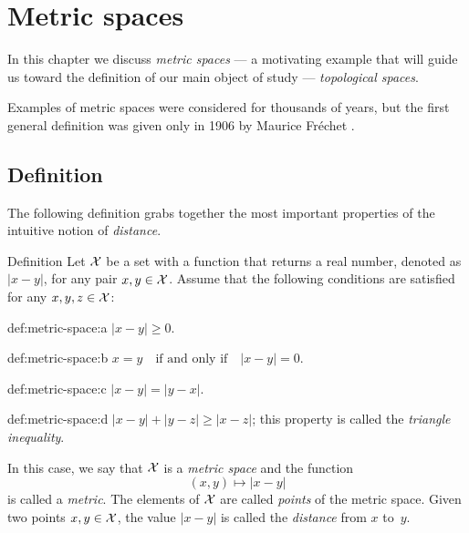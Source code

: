 \chapter{Metric spaces}

In this chapter we discuss \textit{metric spaces} --- 
a motivating example that will guide us toward the definition of our main object of study ---
\textit{topological spaces}.

Examples of metric spaces were considered for thousands of years,
but the first general definition was given only in 1906 by Maurice Fr\'echet \cite{frechet}.

\section{Definition}

The following definition grabs together the most important properties of the intuitive notion of \textit{distance}.

\begin{thm}{Definition}\label{def:metric-space}
Let $\mathcal{X}$ be a set
with a function 
that returns a real number, denoted as $|x-y|$,
for any pair $x,y\in\mathcal{X}$.
Assume that the following conditions are satisfied for any
$x,y,z\in \mathcal{X}$:

\begin{subthm}{def:metric-space:a}
$|x-y|\ge 0.$
\end{subthm}

\begin{subthm}{def:metric-space:b}
$x=y\quad\text{if and only if}\quad |x-y|=0.$
\end{subthm}

\begin{subthm}{def:metric-space:c}
$|x-y| = |y- x|.$
\end{subthm}

\begin{subthm}{def:metric-space:d}
$|x- y| + |y- z| \ge |x-z|$; this property is called the \emph{triangle inequality}.
\end{subthm}

In this case, we say that $\mathcal{X}$ is a \emph{metric space}
and the function 
\[(x,y)\mapsto |x-y|\] 
is called a \emph{metric}. 
The elements of $\mathcal{X}$ are called \emph{points} of the metric space.
Given two points $x,y\z\in \c{X}$,
the value $|x-y|$ is called the \emph{distance} from $x$ to~$y$.
\end{thm}

